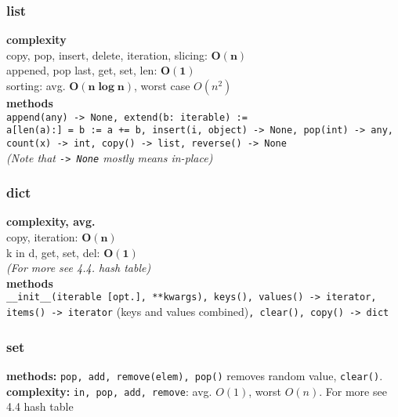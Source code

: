 \documentclass[]{article}
\newcommand\logn  {\log n}
\begin{document}
\begin{multicols}{2}
		\subsubsection{list}
		\textbf{complexity} \\
		copy, pop, insert, delete, iteration, slicing: $ \bm{O(n)} $ \\
		appened, pop last, get, set, len: $ \bm{O(1)} $ \\
		sorting: avg. $ \bm{O(n \logn)} $, worst case $ O(n^2) $ \\
		\textbf{methods} \\
		\texttt{append(any) -> None, extend(b: iterable) := \\ a[len(a):] = b := a += b, insert(i, object) -> None, pop(int) -> any, count(x) -> int, copy() -> list, reverse() -> None} \\
		\textit{(Note that \texttt{-> None} mostly means in-place)} 
		\subsubsection{dict}
		\textbf{complexity, avg. } \\
		copy, iteration: $ \bm{O(n)} $ \\
		k in d, get, set, del: $ \bm{O(1)} $ \\
		\textit{(For more see 4.4. hash table)} \\
		\textbf{methods} \\
		\texttt{\_\_init\_\_(iterable [opt.], **kwargs), keys(), values() -> iterator, items() -> iterator} (keys and values combined)\texttt{, clear(), copy() -> dict}
		\subsubsection{set}
		\textbf{methods: }\texttt{pop, add, remove(elem), pop()} removes random value, \texttt{clear()}. \\
		\textbf{complexity: }\texttt{in, pop, add, remove}: avg. $ O(1) $, worst $ O(n) $. For more see 4.4 hash table
		

\end{multicols}
\end{document}
